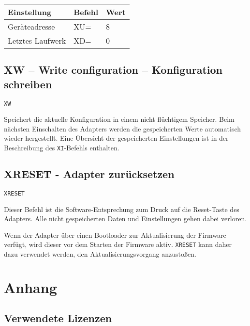 \documentclass[10pt,a4paper]{scrartcl}		%
\begin{document}
\begin{tabular}[c]{l l l}
\toprule 
Einstellung & Befehl & Wert\\
\midrule
Geräteadresse		& XU= & 8 \\
Letztes Laufwerk	& XD= & 0 \\
\bottomrule
\end{tabular}

\subsection{XW -- Write configuration -- Konfiguration schreiben}

\texttt{XW}

Speichert die aktuelle Konfiguration in einem nicht flüchtigem Speicher.
Beim nächsten Einschalten des Adapters werden die gespeicherten Werte
automatisch wieder hergestellt. Eine Übersicht der gespeicherten
Einstellungen ist in der Beschreibung des \texttt{XI}-Befehls enthalten.

\subsection{XRESET - Adapter zurücksetzen}

\texttt{XRESET}

Dieser Befehl ist die Software-Entsprechung zum Druck auf die Reset-Taste
des Adapters. Alle nicht gespeicherten Daten und Einstellungen gehen
dabei verloren.

Wenn der Adapter über einen Bootloader zur Aktualisierung der Firmware
verfügt, wird dieser vor dem Starten der Firmware aktiv. \texttt{XRESET}
kann daher dazu verwendet werden, den Aktualisierungsvorgang anzustoßen.

\section{Anhang}
\subsection{Verwendete Lizenzen}



\renewcommand{\indexname}{Stichwortverzeichnis}
\printindex
\end{document}
